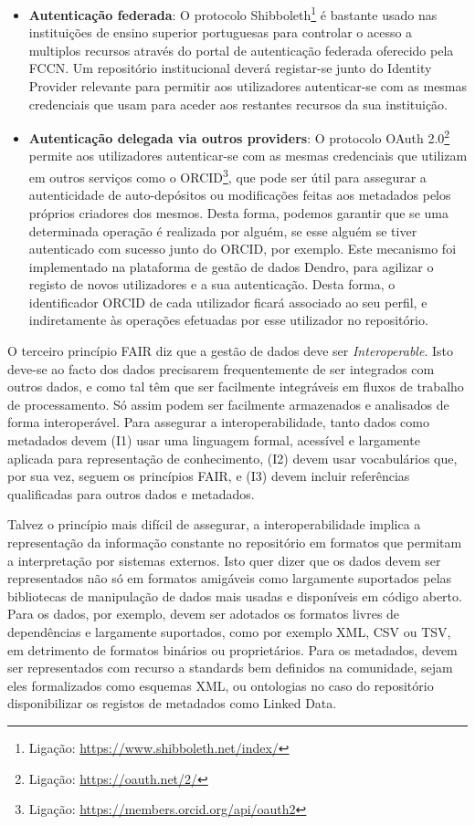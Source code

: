\documentclass[sigconf,nonacm]{acmart}
\begin{document}
\begin{itemize}
  \item \textbf{Autenticação federada}: O protocolo Shibboleth\footnote{Ligação: \url{https://www.shibboleth.net/index/}} é bastante usado nas instituições de ensino superior portuguesas para controlar o acesso a multiplos recursos através do portal de autenticação federada oferecido pela FCCN. Um repositório institucional deverá registar-se junto do Identity Provider relevante para permitir aos utilizadores autenticar-se com as mesmas credenciais que usam para aceder aos restantes recursos da sua instituição.
  \item \textbf{Autenticação delegada via outros providers}: O protocolo OAuth 2.0\footnote{Ligação: \url{https://oauth.net/2/}} permite aos utilizadores autenticar-se com as mesmas credenciais que utilizam em outros serviços como o ORCID\footnote{Ligação: \url{https://members.orcid.org/api/oauth2}}, que pode ser útil para assegurar a autenticidade de auto-depósitos ou modificações feitas aos metadados pelos próprios criadores dos mesmos. Desta forma, podemos garantir que se uma determinada operação é realizada por alguém, se esse alguém se tiver autenticado com sucesso junto do ORCID, por exemplo. Este mecanismo foi implementado na plataforma de gestão de dados Dendro, para agilizar o registo de novos utilizadores e a sua autenticação. Desta forma, o identificador ORCID de cada utilizador ficará associado ao seu perfil, e indiretamente às operações efetuadas por esse utilizador no repositório.
\end{itemize}


O terceiro princípio FAIR diz que a gestão de dados deve ser \emph{Interoperable}. Isto deve-se ao facto dos dados precisarem frequentemente de ser integrados com outros dados, e como tal têm que ser facilmente integráveis em fluxos de trabalho de processamento. Só assim podem ser facilmente armazenados e analisados de forma interoperável. Para assegurar a interoperabilidade, tanto dados como metadados devem (I1) usar uma linguagem formal, acessível e largamente aplicada para representação de conhecimento, (I2) devem usar vocabulários que, por sua vez, seguem os princípios FAIR, e (I3) devem incluir referências qualificadas para outros dados e metadados.

Talvez o princípio mais difícil de assegurar, a interoperabilidade implica a representação da informação constante no repositório em formatos que permitam a interpretação por sistemas externos. Isto quer dizer que os dados devem ser representados não só em formatos amigáveis como largamente suportados pelas bibliotecas de manipulação de dados mais usadas e disponíveis em código aberto. Para os dados, por exemplo, devem ser adotados os formatos livres de dependências e largamente suportados, como por exemplo XML, CSV ou TSV, em detrimento de formatos binários ou proprietários. Para os metadados, devem ser representados com recurso a standards bem definidos na comunidade, sejam eles formalizados como esquemas XML, ou ontologias no caso do repositório disponibilizar os registos de metadados como Linked Data. 
\end{document}
